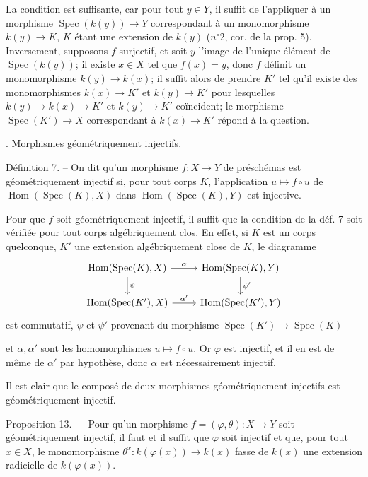 \noindent La condition est suffisante, car pour tout $y \in Y$, il suffit de l'appliquer à un morphisme $\operatorname{Spec}(k(y)) \to Y$ correspondant à un monomorphisme $k(y) \to K$, $K$ étant une extension de $k(y)$ ($n^\circ 2$, cor. de la prop. 5). Inversement, supposons $f$ surjectif, et soit $y$ l'image de l'unique élément de $\operatorname{Spec}(k(y))$; il existe $x \in X$ tel que $f(x) = y$, donc $f$ définit un monomorphisme $k(y) \to k(x)$; il suffit alors de prendre $K'$ tel qu'il existe des monomorphismes $k(x) \to K'$ et $k(y) \to K'$ pour lesquelles $k(y) \to k(x) \to K'$ et $k(y) \to K'$ coïncident; le morphisme $\operatorname{Spec}(K') \to X$ correspondant à $k(x) \to K'$ répond à la question.

. Morphismes géométriquement injectifs.

\noindent Définition 7. -- On dit qu'un morphisme $f : X \to Y$ de préschémas est géométriquement injectif si, pour tout corps $K$, l'application $u \mapsto f \circ u$ de $\operatorname{Hom}(\operatorname{Spec}(K), X)$ dans $\operatorname{Hom}(\operatorname{Spec}(K), Y)$ est injective.

\noindent Pour que $f$ soit géométriquement injectif, il suffit que la condition de la déf. 7 soit vérifiée pour tout corps algébriquement clos. En effet, si $K$ est un corps quelconque, $K'$ une extension algébriquement close de $K$, le diagramme
$$\begin{tikzcd}
\operatorname{Hom}(\operatorname{Spec}(K), X) \arrow[r, "\alpha"] \arrow[d, "\psi"] & \operatorname{Hom}(\operatorname{Spec}(K), Y) \arrow[d, "\psi'"] \\
\operatorname{Hom}(\operatorname{Spec}(K'), X) \arrow[r, "\alpha'"] & \operatorname{Hom}(\operatorname{Spec}(K'), Y)
\end{tikzcd}$$
est commutatif, $\psi$ et $\psi'$ provenant du morphisme $\operatorname{Spec}(K') \to \operatorname{Spec}(K)$

\newpage


et $\alpha, \alpha'$ sont les homomorphismes $u \mapsto f \circ u$. Or $\varphi$ est injectif, et il en est de même de $\alpha'$ par hypothèse, donc $\alpha$ est nécessairement injectif.

Il est clair que le composé de deux morphismes géométriquement injectifs est géométriquement injectif.

Proposition 13. — Pour qu'un morphisme $f = (\varphi, \theta) : X \to Y$ soit géométriquement injectif, il faut et il suffit que $\varphi$ soit injectif et que, pour tout $x \in X$, le monomorphisme $\theta^x : k(\varphi(x)) \to k(x)$ fasse de $k(x)$ une extension radicielle de $k(\varphi(x))$.

